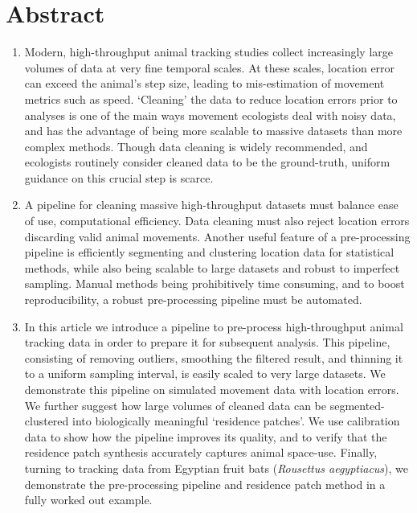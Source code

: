 \documentclass[10pt,paper=a4,headings=standardclasses
]{scrartcl}
\begin{document}
\linenumbers

\section*{Abstract} %
\noindent
\begin{enumerate}
    \item Modern, high-throughput animal tracking studies collect increasingly large volumes of data at very fine temporal scales.
    At these scales, location error can exceed the animal's step size, leading to mis-estimation of movement metrics such as speed.
    `Cleaning' the data to reduce location errors prior to analyses is one of the main ways movement ecologists deal with noisy data, and has the advantage of being more scalable to massive datasets than more complex methods.
    Though data cleaning is widely recommended, and ecologists routinely consider cleaned data to be the ground-truth, uniform guidance on this crucial step is scarce.
    
    \item A pipeline for cleaning massive high-throughput datasets must balance ease of use, computational efficiency.
    Data cleaning must also reject location errors discarding valid animal movements.
    Another useful feature of a pre-processing pipeline is efficiently segmenting and clustering location data for statistical methods, while also being scalable to large datasets and robust to imperfect sampling.
    Manual methods being prohibitively time consuming, and to boost reproducibility, a robust pre-processing pipeline must be automated.
    
    \item In this article we introduce a pipeline to pre-process high-throughput animal tracking data in order to prepare it for subsequent analysis.
    This pipeline, consisting of removing outliers, smoothing the filtered result, and thinning it to a uniform sampling interval, is easily scaled to very large datasets.
    We demonstrate this pipeline on simulated movement data with location errors.
    We further suggest how large volumes of cleaned data can be segmented-clustered into biologically meaningful ‘residence patches’.
    We use calibration data to show how the pipeline improves its quality, and to verify that the residence patch synthesis accurately captures animal space-use.
    Finally, turning to tracking data from Egyptian fruit bats (\textit{Rousettus aegyptiacus}), we demonstrate the pre-processing pipeline and residence patch method in a fully worked out example.
    

\end{enumerate}
\end{document}

